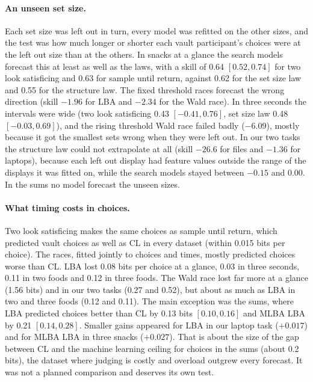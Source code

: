 \documentclass[11pt]{article}
\begin{document}
\paragraph{An unseen set size.} Each set size was left out in turn, every model was refitted on the other sizes, and the test was how much longer or shorter each vault participant's choices were at the left out size than at the others. In snacks at a glance the search models forecast this at least as well as the laws, with a skill of 0.64 $[0.52, 0.74]$ for two look satisficing and 0.63 for sample until return, against 0.62 for the set size law and 0.55 for the structure law. The fixed threshold races forecast the wrong direction (skill $-1.96$ for LBA and $-2.34$ for the Wald race). In three seconds the intervals were wide (two look satisficing 0.43 $[-0.41, 0.76]$, set size law 0.48 $[-0.03, 0.69]$), and the rising threshold Wald race failed badly ($-6.09$), mostly because it got the smallest sets wrong when they were left out. In our two tasks the structure law could not extrapolate at all (skill $-26.6$ for files and $-1.36$ for laptops), because each left out display had feature values outside the range of the displays it was fitted on, while the search models stayed between $-0.15$ and $0.00$. In the sums no model forecast the unseen sizes.

\paragraph{What timing costs in choices.} Two look satisficing makes the same choices as sample until return, which predicted vault choices as well as CL in every dataset (within 0.015 bits per choice). The races, fitted jointly to choices and times, mostly predicted choices worse than CL. LBA lost 0.08 bits per choice at a glance, 0.03 in three seconds, 0.11 in two foods and 0.12 in three foods. The Wald race lost far more at a glance (1.56 bits) and in our two tasks (0.27 and 0.52), but about as much as LBA in two and three foods (0.12 and 0.11). The main exception was the sums, where LBA predicted choices better than CL by 0.13 bits $[0.10, 0.16]$ and MLBA LBA by 0.21 $[0.14, 0.28]$. Smaller gains appeared for LBA in our laptop task ($+0.017$) and for MLBA LBA in three snacks ($+0.027$). That is about the size of the gap between CL and the machine learning ceiling for choices in the sums (about 0.2 bits), the dataset where judging is costly and overload outgrew every forecast. It was not a planned comparison and deserves its own test.
\end{document}
